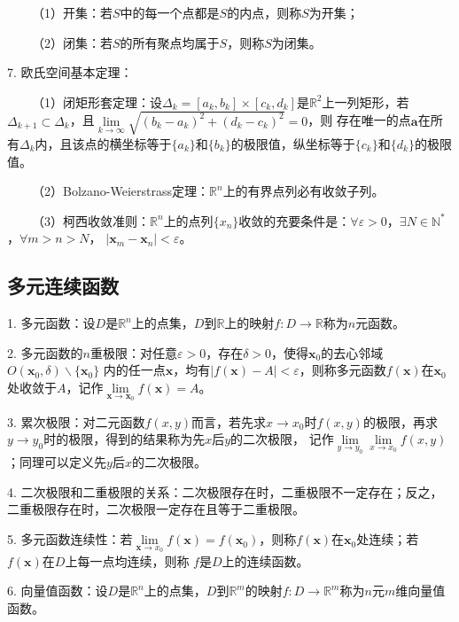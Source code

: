 ~~~~（1）开集：若$S$中的每一个点都是$S$的内点，则称$S$为开集；

~~~~（2）闭集：若$S$的所有聚点均属于$S$，则称$S$为闭集。

7. 欧氏空间基本定理：

~~~~（1）闭矩形套定理：设$\Delta_k=[a_k,b_k]\times [c_k,d_k]$是$\mathbb{R}^2$上一列矩形，若$\Delta_{k+1}\subset \Delta_k$，且$\lim\limits_{k\rightarrow\infty}\sqrt{(b_k-a_k)^2+(d_k-c_k)^2}=0$，则
存在唯一的点$\mathbf{a}$在所有$\Delta_k$内，且该点的横坐标等于$\{a_k\}$和$\{b_k\}$的极限值，纵坐标等于$\{c_k\}$和$\{d_k\}$的极限值。

~~~~（2）Bolzano-Weierstrass定理：$\mathbb{R}^n$上的有界点列必有收敛子列。

~~~~（3）柯西收敛准则：$\mathbb{R}^n$上的点列$\{x_n\}$收敛的充要条件是：$\forall \varepsilon>0$，$\exists N \in \mathbb{N}^*$，$\forall m>n>N$，
$|\mathbf{x}_m-\mathbf{x}_n|<\varepsilon$。

\subsection{多元连续函数}

1. 多元函数：设$D$是$\mathbb{R}^n$上的点集，$D$到$\mathbb{R}$上的映射$f:D\rightarrow \mathbb{R}$称为$n$元函数。

2. 多元函数的$n$重极限：对任意$\varepsilon>0$，存在$\delta>0$，使得$\mathbf{x}_0$的去心邻域$O(\mathbf{x}_0,\delta)\backslash \{\mathbf{x}_0\}$
内的任一点$\mathbf{x}$，均有$|f(\mathbf{x})-A|<\varepsilon$，则称多元函数$f(\mathbf{x})$在$\mathbf{x}_0$处收敛于$A$，记作$\lim\limits_{\mathbf{x}\rightarrow\mathbf{x}_0}f(\mathbf{x})=A$。

3. 累次极限：对二元函数$f(x,y)$而言，若先求$x\rightarrow x_0$时$f(x,y)$的极限，再求$y\rightarrow y_0$时的极限，得到的结果称为先$x$后$y$的二次极限，
记作$\lim\limits_{y\rightarrow y_0}\lim\limits_{x\rightarrow x_0}f(x,y)$；同理可以定义先$y$后$x$的二次极限。

4. 二次极限和二重极限的关系：二次极限存在时，二重极限不一定存在；反之，二重极限存在时，二次极限一定存在且等于二重极限。

5. 多元函数连续性：若$\lim\limits_{\mathbf{x} \rightarrow x_0}f(\mathbf{x})=f(\mathbf{x}_0)$，则称$f(\mathbf{x})$在$\mathbf{x}_0$处连续；若$f(\mathbf{x})$在$D$上每一点均连续，则称
$f$是$D$上的连续函数。

6. 向量值函数：设$D$是$\mathbb{R}^n$上的点集，$D$到$\mathbb{R}^m$的映射$f:D\rightarrow \mathbb{R}^m$称为$n$元$m$维向量值函数。

